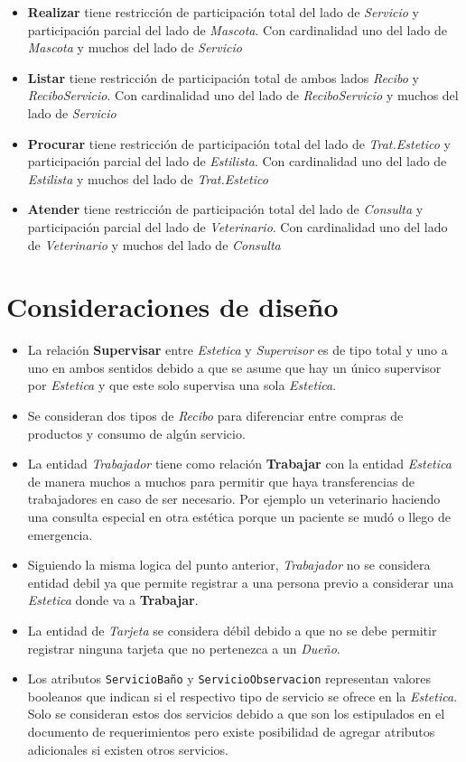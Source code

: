 \documentclass{exam}
\begin{document}
\begin{itemize}
	\item \textbf{Realizar} tiene restricción de participación total del lado de \textit{Servicio} y participación parcial del lado de \textit{Mascota}. Con cardinalidad uno del lado de \textit{Mascota} y muchos del lado de \textit{Servicio}
	\item \textbf{Listar} tiene restricción de participación total de ambos lados \textit{Recibo} y \textit{ReciboServicio}. Con cardinalidad uno del lado de \textit{ReciboServicio} y muchos del lado de \textit{Servicio}
	\item \textbf{Procurar} tiene restricción de participación total del lado de \textit{Trat.Estetico} y participación parcial del lado de \textit{Estilista}. Con cardinalidad uno del lado de \textit{Estilista} y muchos del lado de \textit{Trat.Estetico}
	\item \textbf{Atender} tiene restricción de participación total del lado de \textit{Consulta} y participación parcial del lado de \textit{Veterinario}. Con cardinalidad uno del lado de \textit{Veterinario} y muchos del lado de \textit{Consulta}
\end{itemize}

\section*{Consideraciones de diseño}

\begin{itemize}
	\item La relación \textbf{Supervisar} entre \textit{Estetica} y \textit{Supervisor} es de tipo total y uno a uno en ambos sentidos debido a que se asume que hay un único supervisor por \textit{Estetica} y que este solo supervisa una sola \textit{Estetica}.
	\item Se consideran dos tipos de \textit{Recibo} para diferenciar entre compras de productos y consumo de algún servicio.
	\item La entidad \textit{Trabajador} tiene como relación \textbf{Trabajar} con la entidad \textit{Estetica} de manera muchos a muchos para permitir que haya transferencias de trabajadores en caso de ser necesario. Por ejemplo un veterinario haciendo una consulta especial en otra estética porque un paciente se mudó o llego de emergencia.
	\item Siguiendo la misma logica del punto anterior, \textit{Trabajador} no se considera entidad debil ya que permite registrar a una persona previo a considerar una \textit{Estetica} donde va a \textbf{Trabajar}.
	\item La entidad de \textit{Tarjeta} se considera débil debido a que no se debe permitir registrar ninguna tarjeta que no pertenezca a un \textit{Dueño}.
	\item Los atributos \texttt{ServicioBaño} y \texttt{ServicioObservacion} representan valores booleanos que indican si el respectivo tipo de servicio se ofrece en la \textit{Estetica}. Solo se consideran estos dos servicios debido a que son los estipulados en el documento de requerimientos pero existe posibilidad de agregar atributos adicionales si existen otros servicios.
\end{itemize}
\end{document}
